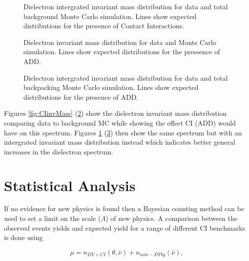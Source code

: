 \begin{figure}[h!p]
\centering
\caption{Dielectron intergrated invariant mass distribution for data and total background Monte Carlo simulation. Lines show expected distributions for the presence of Contact Interactions.}
\label{fig:CIintinvMass}
\end{figure}

\begin{figure}[h!p]
\centering
\caption{Dielectron invariant mass distribution for data and Monte Carlo simulation. Lines show expected distributions for the pressence of ADD.}
\label{fig:ADDinvMass}
\end{figure}

\begin{figure}[h!p]
\centering
\caption{Dielectron intergrated invariant mass distribution for data and total backpacking Monte Carlo simulation. Lines show expected distributions for the presence of ADD.}
\label{fig:ADDintinvMass}
\end{figure}


Figures \ref{fig:CIinvMass} (\ref{fig:ADDinvMass}) show the dielectron invariant mass distribution comparing data to background MC while showing the effect CI (ADD) would have on this spectrum. Figures \ref{fig:CIintinvMass} (\ref{fig:ADDintinvMass}) then show the same spectrum but with an intergrated invariant mass distribution instead which indicates better general increases in the dielectron spectrum.











\section{Statistical Analysis}
If no evidence for new physics is found then a Bayesian counting method can be used to set a limit on the scale ($\Lambda$) of new physics. A comparison between the observed events yields and expected yield for a range of different CI benchmarks is done using 

\begin{equation}
        \mu = n_{DY+CI}(\theta,\bar{\nu}) + n_{non-DY bg}(\bar{\nu}),
\end{equation}

